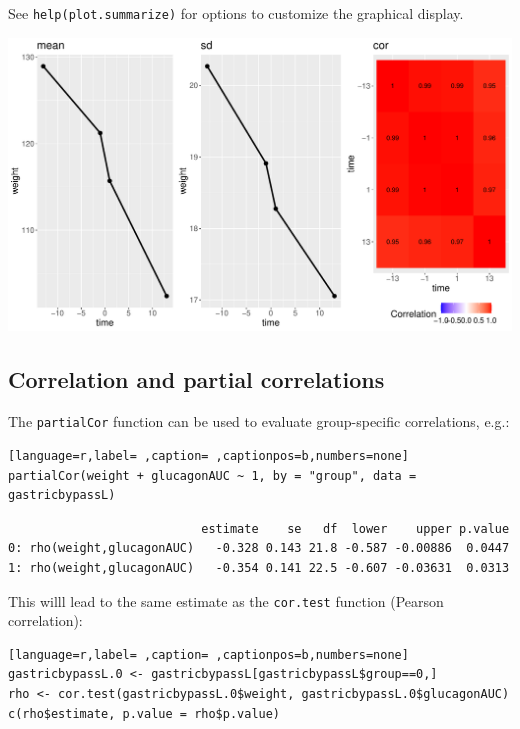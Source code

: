 \documentclass[12pt]{article}
\begin{document}
See \texttt{help(plot.summarize)} for options to customize the graphical
display.

\begin{center}
\includegraphics[trim={0 0 0 0},width=1\textwidth]{./figures/summarize.pdf}
\end{center}

\clearpage

\subsection{Correlation and partial correlations}
\label{sec:org97c6ac6}

The \texttt{partialCor} function can be used to evaluate group-specific
correlations, e.g.:
\begin{lstlisting}[language=r,label= ,caption= ,captionpos=b,numbers=none]
partialCor(weight + glucagonAUC ~ 1, by = "group", data = gastricbypassL)
\end{lstlisting}

\begin{verbatim}
                           estimate    se   df  lower    upper p.value
0: rho(weight,glucagonAUC)   -0.328 0.143 21.8 -0.587 -0.00886  0.0447
1: rho(weight,glucagonAUC)   -0.354 0.141 22.5 -0.607 -0.03631  0.0313
\end{verbatim}


This willl lead to the same estimate as the \texttt{cor.test} function
(Pearson correlation):
\begin{lstlisting}[language=r,label= ,caption= ,captionpos=b,numbers=none]
gastricbypassL.0 <- gastricbypassL[gastricbypassL$group==0,]
rho <- cor.test(gastricbypassL.0$weight, gastricbypassL.0$glucagonAUC)
c(rho$estimate, p.value = rho$p.value)
\end{lstlisting}
\end{document}
